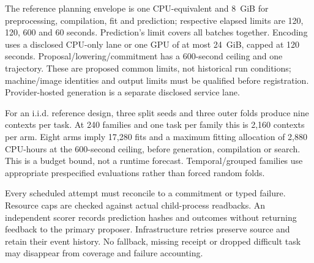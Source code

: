The reference planning envelope is one CPU-equivalent and 8~GiB for
preprocessing, compilation, fit and prediction; respective elapsed limits are
120, 120, 600 and 60 seconds. Prediction's limit covers all batches together.
Encoding uses a disclosed CPU-only lane or one GPU of at most 24~GiB, capped at
120 seconds. Proposal/lowering/commitment has a 600-second ceiling and one
trajectory. These are proposed common limits, not historical run conditions;
machine/image identities and output limits must be qualified before registration.
Provider-hosted generation is a separate disclosed service lane.

For an i.i.d. reference design, three split seeds and three outer folds produce
nine contexts per task. At 240 families and one task per family this is 2,160
contexts per arm. Eight arms imply 17,280 fits and a maximum fitting allocation
of 2,880 CPU-hours at the 600-second ceiling, before generation, compilation or
search. This is a budget bound, not a runtime forecast. Temporal/grouped families
use appropriate prespecified evaluations rather than forced random folds.

Every scheduled attempt must reconcile to a commitment or typed failure.
Resource caps are checked against actual child-process readbacks. An independent
scorer records prediction hashes and outcomes without returning feedback to the
primary proposer. Infrastructure retries preserve source and retain their event
history. No fallback, missing receipt or dropped difficult task may disappear
from coverage and failure accounting.
